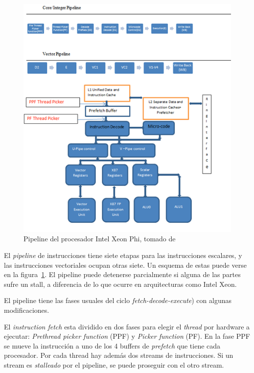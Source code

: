 \begin{figure}[htbp]
   \centering
   \includegraphics[width=\plotwidth]{images/xeon-phi-pipeline.png}
   \caption{Pipeline del procesador Intel Xeon Phi, tomado de~\cite{BookXeonPhi} }
   \label{fig::xeon_phi_pipeline}
\end{figure}


El \textit{pipeline} de instrucciones tiene siete etapas  para las instrucciones escalares, y las
instrucciones vectoriales ocupan otras siete. Un esquema de estas puede verse en la figura~\ref{fig::xeon_phi_pipeline}.
El pipeline puede detenerse parcialmente si alguna de las partes sufre un stall, a diferencia de lo que ocurre en
arquitecturas como Intel Xeon.

El pipeline tiene las fases usuales del ciclo \textit{fetch-decode-execute}) con algunas modificaciones.

El \textit{instruction fetch} esta dividido en dos fases para elegir el \textit{thread} por hardware a ejecutar:
\textit{Prethread picker function} (PPF) y \textit{Picker function} (PF). En la fase PPF se mueve la instrucci\'on
a uno de los 4 buffers de \textit{prefetch} que tiene cada procesador. Por cada thread hay adem\'as dos streams de
instrucciones. Si un stream es \textit{stalleado} por el pipeline, se puede proseguir con el otro stream.

